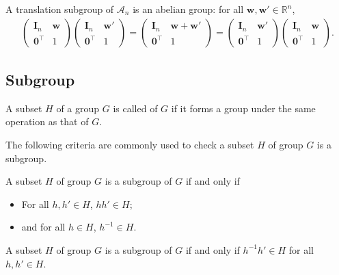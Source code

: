A translation subgroup of $\mathcal{A}_{n}$ is an abelian group: for all $\bm{w}, \bm{w}' \in \mathbb{R}^{n}$,
\begin{align*}
  \begin{pmatrix} \bm{I}_{n} & \bm{w} \\ \bm{0}^{\top} & 1 \end{pmatrix}
  \begin{pmatrix} \bm{I}_{n} & \bm{w}' \\ \bm{0}^{\top} & 1 \end{pmatrix}
  =
  \begin{pmatrix} \bm{I}_{n} & \bm{w} + \bm{w}' \\ \bm{0}^{\top} & 1 \end{pmatrix}
  =
  \begin{pmatrix} \bm{I}_{n} & \bm{w}' \\ \bm{0}^{\top} & 1 \end{pmatrix}
  \begin{pmatrix} \bm{I}_{n} & \bm{w} \\ \bm{0}^{\top} & 1 \end{pmatrix}.
\end{align*}

\subsection{Subgroup}

\begin{screen}
  \begin{defn}
    A subset $H$ of a group $G$ is called  of $G$ if it forms a group under the same operation as that of $G$.
  \end{defn}
\end{screen}

The following criteria are commonly used to check a subset $H$ of group $G$ is a subgroup.
\begin{screen}
  \begin{prop}
    A subset $H$ of group $G$ is a subgroup of $G$ if and only if
    \begin{itemize}
      \item For all $h, h' \in H$, $hh' \in H$;
      \item and for all $h \in H$, $h^{-1} \in H$.
    \end{itemize}
  \end{prop}
\end{screen}
\begin{screen}
  \begin{prop}
    A subset $H$ of group $G$ is a subgroup of $G$ if and only if $h^{-1}h' \in H$ for all $h, h' \in H$.
  \end{prop}
\end{screen}

